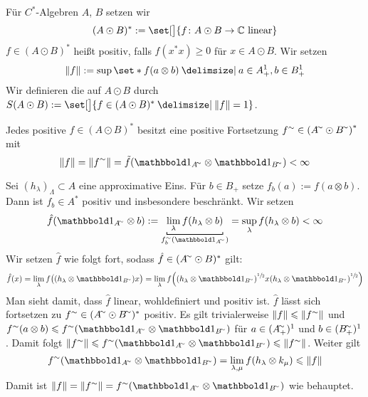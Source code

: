 \begin{definition}[{name=[{Zustände auf dem algebraischen Tensorprodukt}]}]
	Für $C^*$-Algebren $A$, $B$ setzen wir 
	\[
		(A \odot B)^* := \set[\big]{f \colon A \odot B \to \mathbb{C} \text{ linear}}
	\]
	$f \in (A \odot B)^*$ heißt positiv, falls $f(x^* x)\ge 0$ für $x \in A \odot B$.
	Wir setzen
	\[
		\norm*{f} := \sup \set*{f(a \otimes b) \given a \in A^1_+, b \in B_+^1}
	\]
	Wir definieren die  auf $A \odot B$ durch $S(A \odot B) := \set[\big]{f \in (A \odot B)^* \given \norm*{f}=1}$.
\end{definition}

\begin{proposition}
	Jedes positive $f \in (A \odot B)^*$ besitzt eine positive Fortsetzung $f^\sim \in \enbrace*{A^\simm \odot B^\simm}^*$ mit 
	\[
		\norm*{f}= \norm*{f^\sim} = \tilde{f}(\ind_{A^\simm} \otimes \ind_{B^\simm}) < \infty
	\]
\end{proposition}
\begin{beweis}
	Sei $(h_\lambda)_{\Lambda} \subset A$ eine approximative Eins. 
	Für $b \in B_+$ setze $f_b(a) := f (a \otimes b)$.
	Dann ist $f_b \in A^*$ positiv und insbesondere beschränkt.
	Wir setzen
	\[
		\hat{f} \enbrace*{\ind_{A^\simm} \otimes b} := \Underbracket{\lim_\lambda f(h_\lambda \otimes b)}{f^\sim_b (\ind_{A^\simm})} = \sup_\lambda f(h_\lambda \otimes b) < \infty
	\]
	Wir setzen $\hat{f}$ wie folgt fort, sodass $\hat{f} \in (A^\simm \odot B)^*$ gilt:
	\[
		\hat{f}(x) = \lim_\lambda f \enbrace[\big]{\enbrace*{h_\lambda \otimes  \ind_{B^\simm}} x} = \lim_\lambda f\enbrace*{\enbrace*{h_\lambda \otimes  \ind_{B^\simm}}^{\sfrac{1}{2}} x \enbrace*{h_\lambda \otimes  \ind_{B^\simm}}^{\sfrac{1}{2}}}
	\]
	Man sieht damit, dass $\hat{f}$ linear, wohldefiniert und positiv ist. 
	$\hat{f}$ lässt sich fortsetzen zu $f^\sim \in (A^\simm \odot B^\simm)^*$ positiv.
	Es gilt trivialerweise $\norm*{f} \le \norm*{f^\sim}$ und $f^\sim (a \otimes b) \le f^\sim (\ind_{A^\simm} \otimes \ind_{B^\simm})$ für $a \in (A_+^\simm)^1$ und $b \in (B_+^\simm)^1$.
	Damit folgt $\norm*{f^\sim} \le f^\sim (\ind_{A^\simm} \otimes \ind_{B^\simm}) \le \norm*{f^\sim}$.
	Weiter gilt
	\[
		f^\sim \enbrace*{\ind_{A^\simm} \otimes \ind_{B^\simm}} = \lim_{\lambda,\mu} f \enbrace*{h_\lambda \otimes k_\mu} \le \norm*{f}
	\]
	Damit ist $\norm*{f} = \norm*{f^\sim} = f^\sim \enbrace*{\ind_{A^\simm} \otimes \ind_{B^\simm}}$ wie behauptet.
\end{beweis}


